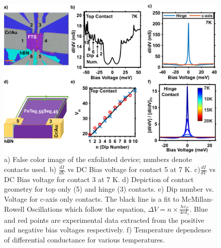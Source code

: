 \par
\begin{figure}
    \centering
    \includegraphics[width=\textwidth]{Chap3/Figures/Figure2.png}
    \caption{a) False color image of the exfoliated device; numbers denote contacts used. b) $\frac{dI}{dV}$ vs DC Bias voltage for contact 5 at 7 K. c)$\frac{dI}{dV}$ vs DC Bias voltage for contact 3 at 7 K. d) Depiction of contact geometry for top only (5) and hinge (3) contacts. e) Dip number vs. Voltage for c-axis only contacts. The black line is a fit to McMillan-Rowell Oscillations which follow the equation, $\Delta V = n\times\frac{hv_{F}}{4ed_{s}}$. Blue and red points are experimental data extracted from the positive and negative bias voltages respectively. f) Temperature dependence of differential conductance for various temperatures.}
    \label{MainResults}
\end{figure}
